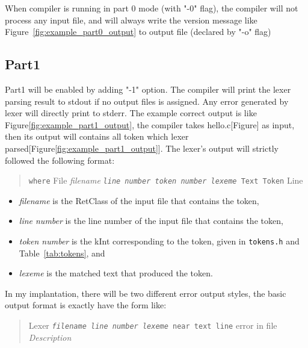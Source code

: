 \documentclass{report}
\newcommand{\+}{}
\begin{document}
    When compiler is running in part 0 mode (with "-0" flag), the compiler will not process any input file, and will
    always write the version message like Figure~\ref{fig:example_part0_output} to output file (declared by "-o" flag)

    \subsection{Part1}\label{subsec:part1}
    Part1 will be enabled by adding "-1" option. The compiler will print the lexer parsing result to stdout if no output
    files is assigned. Any error generated by lexer will directly print to stderr. The example correct output is like
    Figure\ref{fig:example_part1_output}, the compiler takes hello.c[Figure] as input, then its output will contains all
    token which lexer parsed[Figure\ref{fig:example_part1_output}]. The lexer's output will strictly followed the
    following format:
    \begin{quote}
    {\texttt{where} File}
        \emph{filename}
        {\texttt{\emph{line number}
        {\texttt{\emph{token number}
        {\texttt{\emph{lexeme}} Text}} Token}} Line}
    \end{quote}

    \begin{itemize}
        \item \emph{filename}
        is the RetClass of the input file that contains the token,
        \item \emph{line number}
        is the line number of the input file that contains the token,
        \item \emph{token number}
        is the kInt corresponding to the token, given in \verb|tokens.h|
        and Table~\ref{tab:tokens}, and
        \item \emph{lexeme}
        is the matched text that produced the token.
    \end{itemize}

    In my implantation, there will be two different error output styles, the basic output format is exactly have the form like:
    \begin{quote}
        \begin{tabbing}
        {\texttt{} Lexer}
            \= {\texttt{\emph{filename}
            {\texttt{\emph{line number}
            {\texttt{\emph{lexeme}} near text}} line}} error in file}
            \\
            \> \emph{Description}
        \end{tabbing}
    \end{quote}
\end{document}
